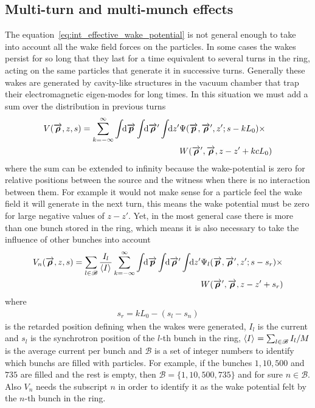 \subsection{Multi-turn and multi-munch effects}\label{ssec:multi_bunch_effects}

    The equation~\eqref{eq:int_effective_wake_potential} is not general enough to take into account all the wake field forces on the particles. In some cases the wakes persist for so long that they last for a time equivalent to several turns in the ring, acting on the same particles that generate it in successive turns. Generally these wakes are generated by cavity-like structures in the vacuum chamber that trap their electromagnetic eigen-modes for long times. In this situation we must add a sum over the distribution in previous turns
    \begin{align}\nonumber
  	  	V(\overrightarrow{\boldsymbol{\rho}}, z, s) = \sum_{k=-\infty}^\infty\int\!\!\text{d}\overrightarrow{\boldsymbol{p}} \int\!\!\text{d}\overrightarrow{\boldsymbol{\rho}}' \int\!\!\text{d}z' 
	  			&\Psi(\overrightarrow{\boldsymbol{p}},\overrightarrow{\boldsymbol{\rho}}',z'; s-kL_0)\times\\ &W(\overrightarrow{\boldsymbol{\rho}}',\overrightarrow{\boldsymbol{\rho}},z-z' + kcL_0)
    \end{align}
    where the sum can be extended to infinity because the wake-potential is zero for relative positions between the source and the witness when there is no interaction between them. For example it would not make sense for a particle feel the wake field it will generate in the next turn, this means the wake potential must be zero for large negative values of $z-z'$. Yet, in the most general case there is more than one bunch stored in the ring, which means it is also necessary to take the influence of other bunches into account
    \begin{align}\label{eq:general_eff_wake_pot}\nonumber
  	  	V_n(\overrightarrow{\boldsymbol{\rho}}, z, s) = \sum_{l\in\mathscr{B}}\frac{I_l}{\left\langle I \right\rangle_{{}}}\sum_{k=-\infty}^\infty\int\!\!\text{d}\overrightarrow{\boldsymbol{p}} \int\!\!\text{d}\overrightarrow{\boldsymbol{\rho}}' \int\!\!\text{d}z' 
	  			&\Psi_l(\overrightarrow{\boldsymbol{p}},\overrightarrow{\boldsymbol{\rho}}',z'; s - s_r) \times\\
				&W(\overrightarrow{\boldsymbol{\rho}}',\overrightarrow{\boldsymbol{\rho}},z - z' + s_r)
    \end{align}
    where
    \begin{align}\label{eq:retarded_time_definition}
        s_r = kL_0-(s_l-s_n)
    \end{align}
    is the retarded position defining when the wakes were generated, $I_l$ is the current and $s_l$ is the synchrotron position of the $l$-th bunch in the ring, $\left\langle I \right\rangle_{{}}=\sum_{l\in\mathscr{B}}I_l/M$ is the average current per bunch and $\mathscr{B}$ is a set of integer numbers to identify which bunchs are filled with particles. For example, if the bunches $1, 10, 500$ and $735$ are filled and the rest is empty, then $\mathscr{B} = \{ 1, 10, 500, 735 \}$ and for sure $n\in\mathscr{B}$. Also $V_n$ needs the subscript $n$ in order to identify it as the wake potential felt by the $n$-th bunch in the ring.

